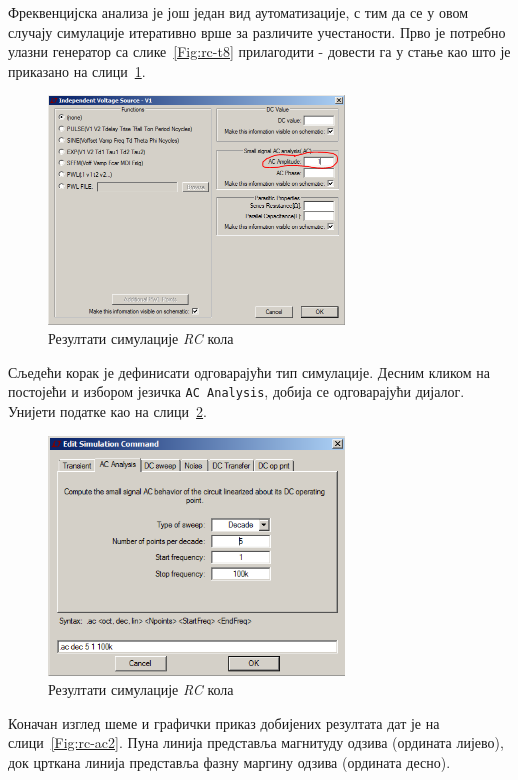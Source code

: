 Фреквенцијска анализа је још један вид аутоматизације, с тим да се у овом случају симулације итеративно врше за различите учестаности. Прво је потребно улазни генератор са слике~\ref{Fig:rc-t8} прилагодити - довести га у стање као што је приказано на слици~\ref{Fig:rc-ac0}.

\begin{figure}[h]
\centering
\includegraphics[width=0.7\textwidth]{figs/rc-ac0.PNG}
\caption{Резултати симулације \textit{RC} кола}
\label{Fig:rc-ac0}
\end{figure}

Сљедећи корак је дефинисати одговарајући тип симулације. Десним кликом на постојећи и избором језичка \texttt{AC Analysis}, добија се одговарајући дијалог. Унијети податке као на слици~\ref{Fig:rc-ac1}.

\begin{figure}[h]
\centering
\includegraphics[width=0.7\textwidth]{figs/rc-ac1.PNG}
\caption{Резултати симулације \textit{RC} кола}
\label{Fig:rc-ac1}
\end{figure}

Коначан изглед шеме и графички приказ добијених резултата дат је на слици~\ref{Fig:rc-ac2}. Пуна линија представља магнитуду одзива (ордината лијево), док црткана линија представља фазну маргину одзива (ордината десно).

